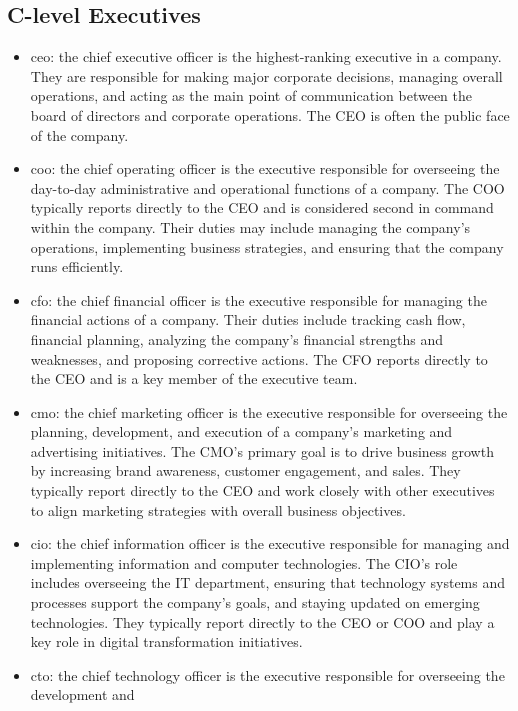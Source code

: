 \documentclass[12pt,a4paper]{report}
\begin{document}
\subsection{ C-level Executives}
\begin{itemize}
  \item ceo: the chief executive officer is the highest-ranking executive in a company. They are responsible for making major corporate decisions, managing overall operations, and acting as the main point of communication between the board of directors and corporate operations. The CEO is often the public face of the company.
  \item coo: the chief operating officer is the executive responsible for overseeing the day-to-day administrative and operational functions of a company. The COO typically reports directly to the CEO and is considered second in command within the company. Their duties may include managing the company's operations, implementing business strategies, and ensuring that the company runs efficiently.
  \item cfo: the chief financial officer is the executive responsible for managing the financial actions of a company. Their duties include tracking cash flow, financial planning, analyzing the company's financial strengths and weaknesses, and proposing corrective actions. The CFO reports directly to the CEO and is a key member of the executive team.
  \item cmo: the chief marketing officer is the executive responsible for overseeing the planning, development, and execution of a company's marketing and advertising initiatives. The CMO's primary goal is to drive business growth by increasing brand awareness, customer engagement, and sales. They typically report directly to the CEO and work closely with other executives to align marketing strategies with overall business objectives.
  \item cio: the chief information officer is the executive responsible for managing and implementing information and computer technologies. The CIO's role includes overseeing the IT department, ensuring that technology systems and processes support the company's goals, and staying updated on emerging technologies. They typically report directly to the CEO or COO and play a key role in digital transformation initiatives.
  \item cto: the chief technology officer is the executive responsible for overseeing the development and
\end{itemize}
\end{document}
